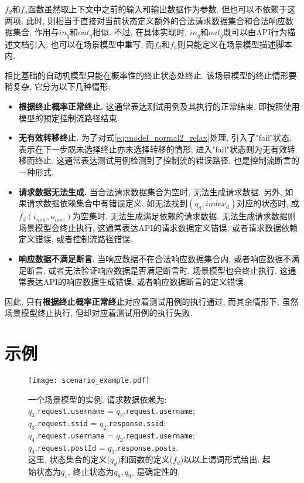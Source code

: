         $f_d$和$f_a$函数虽然取上下文中之前的输入和输出数据作为参数, 但也可以不依赖于这两项, 此时, 则相当于直接对当前状态定义额外的合法请求数据集合和合法响应数据集合, 作用与$in_q$和$out_q$相似. 不过, 在具体实现时, $in_q$和$out_q$既可以由API行为描述文档引入, 也可以在场景模型中重写, 而$f_d$和$f_a$则只能定义在场景模型描述脚本内.
        
        相比基础的自动机模型只能在概率性的终止状态处终止, 该场景模型的终止情形要稍复杂, 它分为以下几种情形:
        \begin{itemize}
            \item \textbf{根据终止概率正常终止.} 这通常表达测试用例及其执行的正常结束, 即按照使用模型的预定控制流路径结束.
            
            \item \textbf{无有效转移终止.} 为了对式\ref{eq:model_normal2_relax}处理, 引入了"fail"状态, 表示在下一步既未选择终止亦未选择转移的情形, 进入"fail"状态则为无有效转移而终止. 这通常表达测试用例检测到了控制流的错误路径, 也是控制流断言的一种形式.
            
            \item \textbf{请求数据无法生成.} 当合法请求数据集合为空时, 无法生成请求数据. 另外, 如果请求数据依赖集合中有错误定义, 如无法找到$(q_d, index_d)$对应的状态时, 或$f_d(i_{now}, o_{now})$为空集时, 无法生成满足依赖的请求数据. 无法生成请求数据则场景模型会终止执行, 这通常表达API的请求数据定义错误, 或者请求数据依赖定义错误, 或者控制流路径错误.
            
            \item \textbf{响应数据不满足断言}. 当响应数据不在合法响应数据集合内, 或者响应数据不满足断言, 或者无法验证响应数据是否满足断言时, 场景模型也会终止执行. 这通常表达API的响应数据生成错误, 或者响应数据断言的定义错误.
        \end{itemize}
        因此, 只有\textbf{根据终止概率正常终止}对应着测试用例的执行通过, 而其余情形下, 虽然场景模型终止执行, 但却对应着测试用例的执行失败.
        
    \section{示例}
        \begin{figure}[!htb]
            \centering
            \texttt{[image: scenario\_example.pdf]}
            \caption{一个场景模型的实例. 请求数据依赖为: \\
            $q_3$.\texttt{request.username} = $q_2$.\texttt{request.username};\\
            $q_3$.\texttt{request.ssid} = $q_2$.\texttt{response.ssid};\\
            $q_4$.\texttt{request.username} = $q_2$.\texttt{request.username};\\
            $q_4$.\texttt{request.postId} = $q_3$.\texttt{response.posts}.\\
            这里, 状态集合的定义($q_d$)和函数的定义($f_d$)以以上谓词形式给出. 起始状态为$q_1$, 终止状态为$q_8, q_9$, 是确定性的.}
            \label{fig:scenario_example}
        \end{figure}
        
